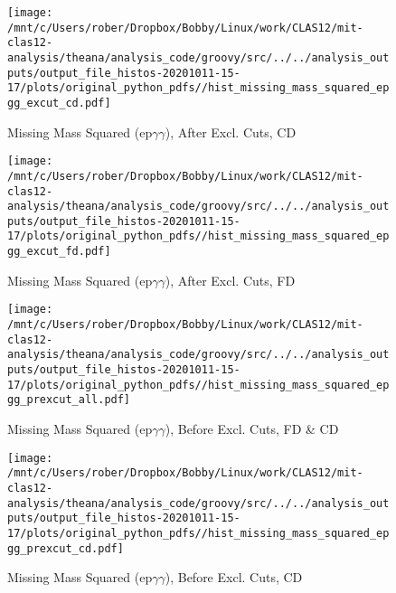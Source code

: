 \documentclass{article}
\begin{document}
\begin{landscape}
    \begin{figure}[h]
        \centering

        \texttt{[image: /mnt/c/Users/rober/Dropbox/Bobby/Linux/work/CLAS12/mit-clas12-analysis/theana/analysis\_code/groovy/src/../../analysis\_outputs/output\_file\_histos-20201011-15-17/plots/original\_python\_pdfs//hist\_missing\_mass\_squared\_epgg\_excut\_cd.pdf]}
        \captionsetup{textformat=empty,labelformat=blank}
        \caption{Missing Mass Squared (ep$\gamma$$\gamma$), After Excl. Cuts, CD}
    \end{figure}
    \clearpage
    
    \begin{figure}[h]
        \centering

        \texttt{[image: /mnt/c/Users/rober/Dropbox/Bobby/Linux/work/CLAS12/mit-clas12-analysis/theana/analysis\_code/groovy/src/../../analysis\_outputs/output\_file\_histos-20201011-15-17/plots/original\_python\_pdfs//hist\_missing\_mass\_squared\_epgg\_excut\_fd.pdf]}
        \captionsetup{textformat=empty,labelformat=blank}
        \caption{Missing Mass Squared (ep$\gamma$$\gamma$), After Excl. Cuts, FD}
    \end{figure}
    \clearpage
    
    \begin{figure}[h]
        \centering

        \texttt{[image: /mnt/c/Users/rober/Dropbox/Bobby/Linux/work/CLAS12/mit-clas12-analysis/theana/analysis\_code/groovy/src/../../analysis\_outputs/output\_file\_histos-20201011-15-17/plots/original\_python\_pdfs//hist\_missing\_mass\_squared\_epgg\_prexcut\_all.pdf]}
        \captionsetup{textformat=empty,labelformat=blank}
        \caption{Missing Mass Squared (ep$\gamma$$\gamma$), Before Excl. Cuts, FD \& CD}
    \end{figure}
    \clearpage
    
    \begin{figure}[h]
        \centering

        \texttt{[image: /mnt/c/Users/rober/Dropbox/Bobby/Linux/work/CLAS12/mit-clas12-analysis/theana/analysis\_code/groovy/src/../../analysis\_outputs/output\_file\_histos-20201011-15-17/plots/original\_python\_pdfs//hist\_missing\_mass\_squared\_epgg\_prexcut\_cd.pdf]}
        \captionsetup{textformat=empty,labelformat=blank}
        \caption{Missing Mass Squared (ep$\gamma$$\gamma$), Before Excl. Cuts, CD}
    \end{figure}
    \clearpage
    

\end{landscape}
\end{document}
